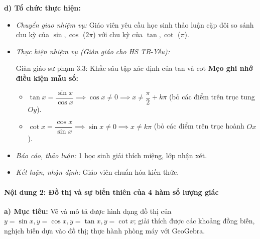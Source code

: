 \documentclass[12pt, a4paper]{article}
\begin{document}
\textbf{d) Tổ chức thực hiện:}
\begin{itemize}[leftmargin=0.6cm]
    \item \textit{Chuyển giao nhiệm vụ:} Giáo viên yêu cầu học sinh thảo luận cặp đôi so sánh chu kỳ của $\sin, \cos$ ($2\pi$) với chu kỳ của $\tan, \cot$ ($\pi$).
    \item \textit{Thực hiện nhiệm vụ (Giàn giáo cho HS TB-Yếu):}
    \begin{scaffoldbox}{Giàn giáo sư phạm 3.3: Khắc sâu tập xác định của tan và cot}
        \textbf{Mẹo ghi nhớ điều kiện mẫu số:}
        \begin{itemize}[leftmargin=0.5cm]
            \item $\tan x = \dfrac{\sin x}{\cos x} \implies \cos x \neq 0 \implies x \neq \dfrac{\pi}{2} + k\pi$ (bỏ các điểm trên trục tung $Oy$).
            \item $\cot x = \dfrac{\cos x}{\sin x} \implies \sin x \neq 0 \implies x \neq k\pi$ (bỏ các điểm trên trục hoành $Ox$).
        \end{itemize}
    \end{scaffoldbox}
    \item \textit{Báo cáo, thảo luận:} 1 học sinh giải thích miệng, lớp nhận xét.
    \item \textit{Kết luận, nhận định:} Giáo viên chuẩn hóa kiến thức.
\end{itemize}

\paragraph{Nội dung 2: Đồ thị và sự biến thiên của 4 hàm số lượng giác}
\textbf{a) Mục tiêu:} Vẽ và mô tả được hình dạng đồ thị của $y = \sin x, y = \cos x, y = \tan x, y = \cot x$; giải thích được các khoảng đồng biến, nghịch biến dựa vào đồ thị; thực hành phòng máy với GeoGebra.
\end{document}
